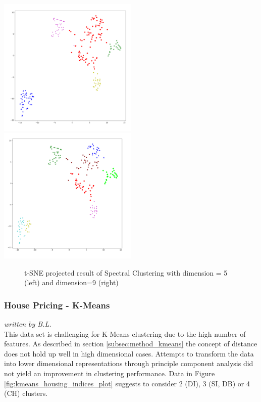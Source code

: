  \hspace{-0.25cm}
 \includegraphics[width=0.5\textwidth]{images/5.PNG} 
 \includegraphics[width=0.5\textwidth]{images/8.PNG} 
 
 \begin{figure}[H]
    \centering
    \caption{t-SNE projected result of Spectral Clustering with dimension = 5 (left) and dimension=9 (right)}
    \label{fig:my_label467}
\end{figure}
 
 



\subsubsection{House Pricing - K-Means}
\textit{written by B.L.}\\

This data set is challenging for K-Means clustering due to the high number of features. As described in section \ref{subsec:method_kmeans} the concept of distance does not hold up well in high dimensional cases. Attempts to transform the data into lower dimensional representations through principle component analysis did not yield an improvement in clustering performance. Data in Figure \ref{fig:kmeans_housing_indices_plot} suggests to consider 2 (\gls{DI}), 3 (\gls{SI}, \gls{DB}) or 4 (\gls{CH}) clusters.

